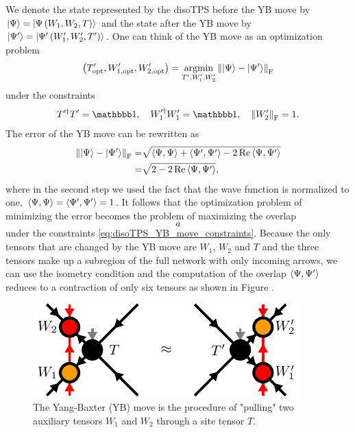 We denote the state represented by the disoTPS before the YB move by $\ket{\Psi} = \ket{\Psi\left(W_1, W_2, T\right)}$ and the state after the YB move by $\ket{\Psi^\prime} = \ket{\Psi^\prime\left(W_1^\prime, W_2^\prime, T^\prime\right)}$. One can think of the YB move as an optimization problem
\begin{equation}
	\label{eq:disoTPS_YB_move_standard}
	\left(T^\prime_\text{opt},W_{1,\text{opt}}^\prime,W_{2,\text{opt}}^\prime\right) = \underset{T^\prime,W_1^\prime,W_2^\prime}{\operatorname{argmin}}\left\lVert \ket{\Psi} - \ket{\Psi^\prime}\right\rVert_\text{F}
\end{equation}
under the constraints
\begin{equation}
	\label{eq:disoTPS_YB_move_constraints}
	T^{\prime\dagger}T^\prime = \id, \quad W_1^{\prime\dagger}W_1^\prime = \id, \quad \left\lVert W_2^\prime \right\rVert_\text{F} = 1.
\end{equation}
The error of the YB move can be rewritten as
\begin{equation}
	\label{eq:disoTPS_YB_move_rewritten_error}
	\begin{split}
		\left\lVert \ket{\Psi} - \ket{\Psi^\prime} \right\rVert_\text{F} =& \sqrt{\braket{\Psi,\Psi} + \braket{\Psi^\prime,\Psi^\prime} - 2\operatorname{Re}\braket{\Psi,\Psi^\prime}} \\
		=& \sqrt{2 - 2\operatorname{Re}\braket{\Psi,\Psi^\prime}},
	\end{split}
\end{equation}
where in the second step we used the fact that the wave function is normalized to one, $\braket{\Psi,\Psi} = \braket{\Psi^\prime,\Psi^\prime} = 1$. It follows that the optimization problem of minimizing the error becomes the problem of maximizing the overlap
\begin{equation}
	\label{eq:disoTPS_YB_move_alternative_formulation}
	a
\end{equation}
under the constraints \eqref{eq:disoTPS_YB_move_constraints}. Because the only tensors that are changed by the YB move are $W_1$, $W_2$ and $T$ and the three tensors make up a subregion of the full network with only incoming arrows, we can use the isometry condition and the computation of the overlap $\braket{\Psi,\Psi^\prime}$ reduces to a contraction of only six tensors as shown in Figure .\par
\begin{figure}
	\centering
	\includegraphics[scale=1]{figures/tikz/disoTPS/yang_baxter_move/yang_baxter_move.pdf}
	\caption{The Yang-Baxter (YB) move is the procedure of "pulling" two auxiliary tensors $W_1$ and $W_2$ through a site tensor $T$.}
	\label{fig:disoTPS_YB_move_closeup}
\end{figure}
